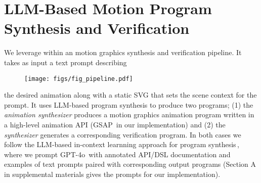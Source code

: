 





\section{LLM-Based Motion Program Synthesis and Verification}
\label{sec:llmsynth}
We leverage \dslname{} within an motion graphics synthesis and
verification pipeline. It takes as input a text prompt describing
\begin{figure}[h]
  \centering
  \texttt{[image: figs/fig\_pipeline.pdf]}
  \vspace{-1.5em}
    \label{fig:pipeline}
\end{figure}

the desired animation along with 
a static SVG that sets the scene context for the prompt.
%
It uses LLM-based program synthesis to produce two programs;
(1) the {\em animation synthesizer} produces a motion graphics animation program written in a high-level
animation API (GSAP\,\cite{gsap} in our implementation)
and (2) the {\em \dslname{} synthesizer} generates a corresponding \dslname{} verification program.
%
In both cases we follow the LLM-based in-context learnning approach
for program synthesis\,\cite{gupta2023visprog,
  surismenon2023vipergpt}, where we prompt GPT-4o\,\cite{hurst2024gpt}
with annotated API/DSL documentation and examples of text prompts
paired with corresponding output programs
(Section A in supplemental materials gives the prompts for our
implementation).


